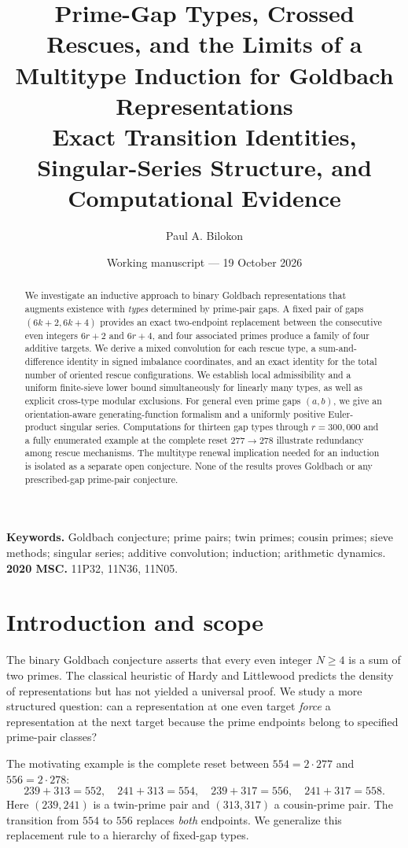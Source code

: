 \documentclass[11pt,a4paper]{article}
\title{\bfseries Prime-Gap Types, Crossed Rescues, and the Limits of a Multitype Induction for Goldbach Representations\\[5pt]
\large Exact Transition Identities, Singular-Series Structure, and Computational Evidence}
\author{Paul A. Bilokon}
\date{Working manuscript --- 19 October 2026}
\theoremstyle{definition}
\theoremstyle{remark}
\begin{document}
\maketitle
\begin{abstract}
We investigate an inductive approach to binary Goldbach representations that augments existence with \emph{types} determined by prime-pair gaps.  A fixed pair of gaps $(6k+2,6k+4)$ provides an exact two-endpoint replacement between the consecutive even integers $6r+2$ and $6r+4$, and four associated primes produce a family of four additive targets.  We derive a mixed convolution for each rescue type, a sum-and-difference identity in signed imbalance coordinates, and an exact identity for the total number of oriented rescue configurations.  We establish local admissibility and a uniform finite-sieve lower bound simultaneously for linearly many types, as well as explicit cross-type modular exclusions.  For general even prime gaps $(a,b)$, we give an orientation-aware generating-function formalism and a uniformly positive Euler-product singular series.  Computations for thirteen gap types through $r=300{,}000$ and a fully enumerated example at the complete reset $277\to278$ illustrate redundancy among rescue mechanisms.  The multitype renewal implication needed for an induction is isolated as a separate open conjecture.  None of the results proves Goldbach or any prescribed-gap prime-pair conjecture.
\end{abstract}
\noindent\textbf{Keywords.} Goldbach conjecture; prime pairs; twin primes; cousin primes; sieve methods; singular series; additive convolution; induction; arithmetic dynamics.\\
\textbf{2020 MSC.} 11P32, 11N36, 11N05.

\section{Introduction and scope}
The binary Goldbach conjecture asserts that every even integer $N\ge4$ is a sum of two primes.  The classical heuristic of Hardy and Littlewood \citep{HardyLittlewood1923} predicts the density of representations but has not yielded a universal proof.  We study a more structured question: can a representation at one even target \emph{force} a representation at the next target because the prime endpoints belong to specified prime-pair classes?

The motivating example is the complete reset between $554=2\cdot277$ and $556=2\cdot278$:
\begin{equation}\label{eq:example-tile}
239+313=552,\quad241+313=554,\quad239+317=556,\quad241+317=558.
\end{equation}
Here $(239,241)$ is a twin-prime pair and $(313,317)$ a cousin-prime pair.  The transition from $554$ to $556$ replaces \emph{both} endpoints.  We generalize this replacement rule to a hierarchy of fixed-gap types.
\end{document}
